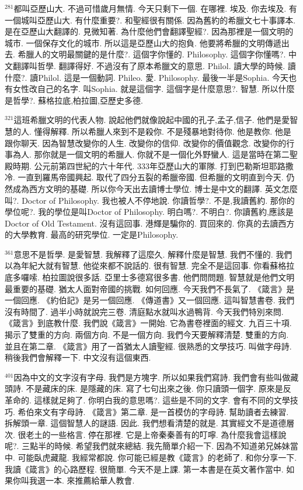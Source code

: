 \documentclass{book}
\begin{document}
$^{281}$都叫亞歷山大.
不過可惜歲月無情.
今天只剩下一個.
在哪裡.
埃及.
你去埃及.
有一個城叫亞歷山大.
有什麼重要?.
和聖經很有關係.
因為舊約的希臘文七十事譯本.
是在亞歷山大翻譯的.
見微知著.
為什麼他們會翻譯聖經?.
因為那裡是一個文明的城市.
一個保存文化的城市.
所以這是亞歷山大的抱負.
他要將希臘的文明傳遞出去.
希臘人的文明最關鍵的是什麼?.
這個字你懂的.
Philosophy.
這個字你懂嗎?.
中文翻譯叫哲學.
翻譯得好.
不過沒有了原本希臘文的意思.
Philol.
讀大學的時候.
讀什麼?.
讀Philol.
這是一個動詞.
Phileo.
愛.
Philosophy.
最後一半是Sophia.
今天也有女性改自己的名字.
叫Sophia.
就是這個字.
這個字是什麼意思?.
智慧.
所以什麼是哲學?.
蘇格拉底,柏拉圖,亞歷史多德.

$^{321}$這班希臘文明的代表人物.
說起他們就像說起中國的孔子,孟子,信子.
他們是愛智慧的人.
懂得解釋.
所以希臘人來到不是殺你.
不是殘暴地對待你.
他是教你.
他是跟你聊天.
因為智慧改變你的人生.
改變你的信仰.
改變你的價值觀念.
改變你的行事為人.
那你就是一個文明的希臘人.
你就不是一個化外野蠻人.
這是當時在第二聖殿時期.
公元前第四世紀的六十年代.
333年亞歷山大的軍隊.
打到巴勒斯坦耶路撒冷.
一直到羅馬帝國興起.
取代了四分五裂的希臘帝國.
但希臘的文明直到今天.
仍然成為西方文明的基礎.
所以你今天出去讀博士學位.
博士是中文的翻譯.
英文怎麼叫?.
Doctor of Philosophy.
我也被人不停地說.
你讀哲學?.
不是,我讀舊約.
那你的學位呢?.
我的學位是叫Doctor of Philosophy.
明白嗎?.
不明白?.
你讀舊約,應該是Doctor of Old Testament.
沒有這回事.
港輝是騙你的.
買回來的.
你真的去讀西方的大學教育.
最高的研究學位.
一定是Philosophy.

$^{361}$意思不是哲學.
是愛智慧.
我解釋了這麼久.
解釋什麼是智慧.
我們不懂的.
我們以為年紀大就有智慧.
他從來都不說話的.
很有智慧.
完全不是這回事.
你看蘇格拉底多囉嗦.
柏拉圖說很多話.
亞里士多德寫很多書.
他們問問題.
智慧就是他們文明最重要的基礎.
猶太人面對帝國的挑戰.
如何回應.
今天我們不長氣了.
《箴言》是一個回應.
《約伯記》是另一個回應.
《傳道書》又一個回應.
這叫智慧書卷.
我們沒有時間了.
過半小時就說完三卷.
清庭點水就叫水過鴨背.
今天我們特別來問.
《箴言》到底教什麼.
我們說《箴言》一開始.
它為書卷裡面的經文.
九百三十項.
揭示了雙重的方向.
兩個方向.
不是一個方向.
我們今天要解釋清楚.
雙重的方向.
並且在第二章.
《箴言》用了一首猶太人讀聖經.
很熟悉的文學技巧.
叫做字母詩.
稍後我們會解釋一下.
中文沒有這個東西.

$^{401}$因為中文的文字沒有字母.
我們是方塊字.
所以如果我們寫詩.
我們會有些叫做藏頭詩.
不是藏床的床.
是隱藏的床.
寫了七句出來之後.
你只讀頭一個字.
原來是反革命的.
這樣就足夠了.
你明白我的意思嗎?.
這些是不同的文字.
會有不同的文學技巧.
希伯來文有字母詩.
《箴言》第二章.
是一首模仿的字母詩.
幫助讀者去練習.
拆解頭一章.
這個智慧人的謎語.
因此.
我們想看清楚的就是.
其實經文不是道德層次.
很老土的一些格言.
停在那裡.
它是上帝秦秦善有的叮嚀.
為什麼我會這樣說呢?.
三點半的時候.
希望我們就來總結.
我先簡單介紹一下.
因為不知道弟兄姊妹當中.
可能臥虎藏龍.
我經常都說.
你可能已經是教《箴言》的老師了.
和你分享一下.
我讀《箴言》的心路歷程.
很簡單.
今天不是上課.
第一本書是在英文著作當中.
如果你叫我選一本.
來推薦給華人教會.
\end{document}
